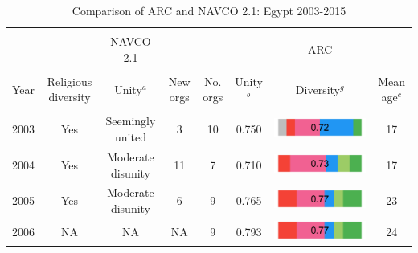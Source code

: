\begin{landscape}

\begin{table}[!htbp] \centering 
  \caption{Comparison of ARC and NAVCO 2.1: Egypt 2003-2015} 
  \label{Tab: Comparison} 
\begin{tabular}{cccc|cccc} 
\\[-1.8ex]\hline 
\hline \\[-1.8ex] 

 & \multicolumn{1}{c}{} & \multicolumn{1}{c}{NAVCO 2.1} &  \multicolumn{1}{c|}{} & \multicolumn{1}{c}{} & \multicolumn{1}{c}{} & \multicolumn{1}{c}{ARC}                                & \multicolumn{1}{c}{}\\
\hline \\[-1.8ex] 
Year & \multicolumn{1}{c}{Religious diversity} & \multicolumn{1}{c}{Unity$^a$} &  \multicolumn{1}{c|}{New orgs} & \multicolumn{1}{c}{No. orgs} & \multicolumn{1}{c}{Unity$^b$} & \multicolumn{1}{c}{Diversity$^g$}                                & \multicolumn{1}{c}{Mean age$^c$}\\
\hline \\[-1.8ex] 
2003 &     Yes     &                         Seemingly united   &                                      3 &                     10 &                    0.750  &         \includegraphics[width = 0.15\columnwidth]{img/ideo2003.jpg}   &    17  \\ 

2004  &     Yes   &                             Moderate disunity   &                                   11 &                    7 &                      0.710  &        \includegraphics[width = 0.15\columnwidth]{img/ideo2004.jpg}   &         17    \\ 

2005  &     Yes     &                        Moderate disunity   &                                      6 &                     9 &                     0.765  &        \includegraphics[width = 0.15\columnwidth]{img/ideo2005.jpg}   &         23    \\ 

2006  &     NA   &                           NA   &                                     NA  &                   9 &                     0.793  &        \includegraphics[width = 0.15\columnwidth]{img/ideo2006.jpg}  &          24    \\ 


\end{tabular}
\end{table}
\end{landscape}
